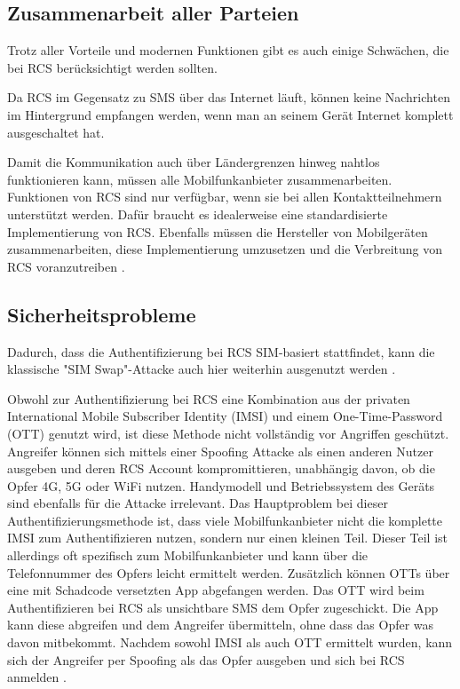 \documentclass[conference]{IEEEtran}
\begin{document}
\subsection{Zusammenarbeit aller Parteien}

Trotz aller Vorteile und modernen Funktionen gibt es auch einige Schwächen, die bei RCS berücksichtigt werden sollten.

Da RCS im Gegensatz zu SMS über das Internet läuft, können keine Nachrichten im Hintergrund empfangen werden, wenn man an seinem Gerät Internet komplett ausgeschaltet hat.

Damit die Kommunikation auch über Ländergrenzen hinweg nahtlos funktionieren kann, müssen alle Mobilfunkanbieter zusammenarbeiten.
Funktionen von RCS sind nur verfügbar, wenn sie bei allen Kontaktteilnehmern unterstützt werden.
Dafür braucht es idealerweise eine standardisierte Implementierung von RCS.
Ebenfalls müssen die Hersteller von Mobilgeräten zusammenarbeiten, diese Implementierung umzusetzen und die Verbreitung von RCS voranzutreiben \cite{rcsmno}.

\subsection{Sicherheitsprobleme}

Dadurch, dass die Authentifizierung bei RCS SIM-basiert stattfindet, kann die klassische "SIM Swap"-Attacke auch hier weiterhin ausgenutzt werden \cite{sendoutsms}.

Obwohl zur Authentifizierung bei RCS eine Kombination aus der privaten International Mobile Subscriber Identity (IMSI) und einem One-Time-Password (OTT) genutzt wird, ist diese Methode nicht vollständig vor Angriffen geschützt.
Angreifer können sich mittels einer Spoofing Attacke als einen anderen Nutzer ausgeben und deren RCS Account kompromittieren, unabhängig davon, ob die Opfer 4G, 5G oder WiFi nutzen.
Handymodell und Betriebssystem des Geräts sind ebenfalls für die Attacke irrelevant.
Das Hauptproblem bei dieser Authentifizierungsmethode ist, dass viele Mobilfunkanbieter nicht die komplette IMSI zum Authentifizieren nutzen, sondern nur einen kleinen Teil.
Dieser Teil ist allerdings oft spezifisch zum Mobilfunkanbieter und kann über die Telefonnummer des Opfers leicht ermittelt werden.
Zusätzlich können OTTs über eine mit Schadcode versetzten App abgefangen werden.
Das OTT wird beim Authentifizieren bei RCS als unsichtbare SMS dem Opfer zugeschickt.
Die App kann diese abgreifen und dem Angreifer übermitteln, ohne dass das Opfer was davon mitbekommt.
Nachdem sowohl IMSI als auch OTT ermittelt wurden, kann sich der Angreifer per Spoofing als das Opfer ausgeben und sich bei RCS anmelden \cite{5gmsg}.
\end{document}
